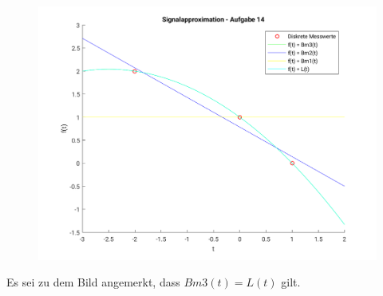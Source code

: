 	\begin{figure}
		\includegraphics[scale = 0.7]{A14_plot.png}
	\end{figure}
	Es sei zu dem Bild angemerkt, dass $Bm3(t) = L(t)$ gilt.
